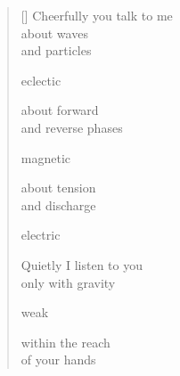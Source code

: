 \documentclass[11pt,a4paper]{article}
\begin{document}
\thispagestyle{empty}

\poemtitle{}

\settowidth{\versewidth}{d'onde et de particules}

\bigskip

\begin{verse}[\versewidth]
  Cheerfully you talk to me \\
  about waves \\
  and particles

  eclectic

  about forward \\
  and reverse phases

  magnetic

  about tension \\
  and discharge

  electric

  Quietly I listen to you \\
  only with gravity

  weak

  within the reach \\
  of your hands
\end{verse}
\end{document}
